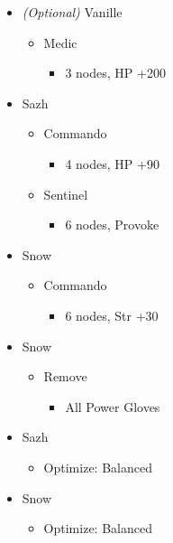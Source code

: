 	\begin{menu}
		\begin{itemize}
			\crystarium
			\begin{itemize}
				\item \textit{(Optional)} Vanille
				      \begin{itemize}
					      \item Medic
					            \begin{itemize}
						            \item 3 nodes, HP +200
					            \end{itemize}
				      \end{itemize}
				\item Sazh
				      \begin{itemize}
					      \item Commando
					            \begin{itemize}
						            \item 4 nodes, HP +90
					            \end{itemize}
					      \item Sentinel
					            \begin{itemize}
						            \item 6 nodes, Provoke
					            \end{itemize}
				      \end{itemize}
				\item Snow
				      \begin{itemize}
					      \item Commando
					            \begin{itemize}
						            \item 6 nodes, Str +30
					            \end{itemize}
				      \end{itemize}
			\end{itemize}
			\equip
			\begin{itemize}
				\item Snow
				      \begin{itemize}
					      \item Remove
					            \begin{itemize}
						            \item All Power Gloves
					            \end{itemize}
				      \end{itemize}
				\item Sazh
				      \begin{itemize}
					      \item Optimize: Balanced
				      \end{itemize}
				\item Snow
				      \begin{itemize}
					      \item Optimize: Balanced
				      \end{itemize}
			\end{itemize}
			\paradigm
			\begin{itemize}
			

\end{itemize}
\end{itemize}
\end{menu}
